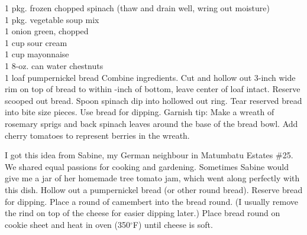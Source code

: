 \begin{minipage}{\linewidth}
\end{minipage}\par\begin{minipage}{\linewidth} 
	\step
	{1 pkg. frozen chopped spinach (thaw and drain well, wring out moisture)\\
	 1 pkg. vegetable soup mix\\	
	 1 onion green, chopped\\
	 1 cup sour cream	\\
	 1 cup mayonnaise \\
	 1 8-oz. can water chestnuts	\\
	 1 loaf pumpernickel bread
		}{
Combine ingredients. Cut and hollow out 3-inch wide rim on top of bread to within -inch of bottom, leave center of loaf intact. Reserve scooped out bread. Spoon spinach dip into hollowed out ring. Tear reserved bread into bite size pieces. Use bread for dipping. Garnish tip:  Make a wreath of rosemary sprigs and back spinach leaves around the base of the bread bowl. Add cherry tomatoes to represent berries in the wreath.}

\end{minipage}\par\begin{minipage}{\linewidth} 
I got this idea from Sabine, my German neighbour in Matumbatu Estates \#25. We shared equal passions for cooking and gardening. Sometimes Sabine would give me a jar of her homemade tree tomato jam, which went along perfectly with this dish.
Hollow out a pumpernickel bread (or other round bread). Reserve bread for dipping. Place a round of camembert into the bread round. (I usually remove the rind on top of the cheese for easier dipping later.) Place bread round on cookie sheet and heat in oven (350$^\circ$F) until cheese is soft.


\end{minipage}
